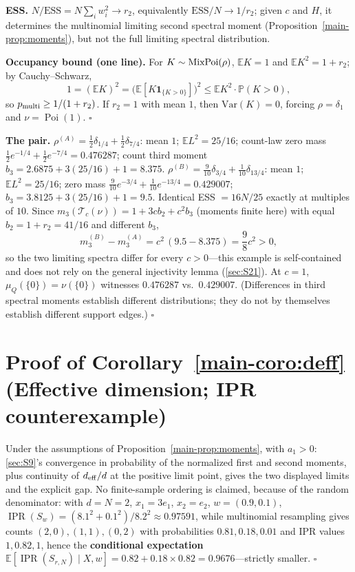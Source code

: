 \textbf{ESS.} $N/\mathrm{ESS}=N\sum_iw_i^2\to r_2$, equivalently $\mathrm{ESS}/N\to1/r_2$; given $c$ and $H$, it determines the multinomial limiting second spectral moment (Proposition~\ref{main-prop:moments}), but not the full limiting spectral distribution.

\textbf{Occupancy bound (one line).} For $K\sim\operatorname{MixPoi}(\rho)$, $\mathbb EK=1$ and $\mathbb EK^2=1+r_2$; by Cauchy--Schwarz,
\[
1=(\mathbb EK)^2=\big(\mathbb E[K\mathbf 1_{\{K>0\}}]\big)^2\le\mathbb EK^2\cdot\mathbb P(K>0),
\]
so $p_{\rm multi}\ge1/(1+r_2)$. If $r_2=1$ with mean $1$, then $\mathrm{Var}(K)=0$, forcing $\rho=\delta_1$ and $\nu=\operatorname{Poi}(1)$. $\square$

\textbf{The pair.} $\rho^{(A)}=\frac12\delta_{1/4}+\frac12\delta_{7/4}$: mean $1$; $\mathbb EL^2=25/16$; count-law zero mass $\frac12e^{-1/4}+\frac12e^{-7/4}=0.476287$; count third moment $b_3=2.6875+3(25/16)+1=8.375$. $\rho^{(B)}=\frac9{10}\delta_{3/4}+\frac1{10}\delta_{13/4}$: mean $1$; $\mathbb EL^2=25/16$; zero mass $\frac9{10}e^{-3/4}+\frac1{10}e^{-13/4}=0.429007$; $b_3=3.8125+3(25/16)+1=9.5$. Identical ESS $=16N/25$ exactly at multiples of $10$. Since $m_3(\mathcal T_c(\nu))=1+3cb_2+c^2b_3$ (moments finite here) with equal $b_2=1+r_2=41/16$ and different $b_3$,
\[
m_3^{(B)}-m_3^{(A)}=c^2\,(9.5-8.375)=\frac98c^2>0,
\]
so the two limiting spectra differ for every $c>0$—this example is self-contained and does not rely on the general injectivity lemma (\ref{sec:S21}). At $c=1$, $\mu_Q(\{0\})=\nu(\{0\})$ witnesses $0.476287$ vs.\ $0.429007$. (Differences in third spectral moments establish different distributions; they do not by themselves establish different support edges.) $\square$

\section{Proof of Corollary~\ref{main-coro:deff} (Effective dimension; IPR counterexample)}\label{sec:S11}

Under the assumptions of Proposition~\ref{main-prop:moments}, with $a_1>0$: \ref{sec:S9}'s convergence in probability of the normalized first and second moments, plus continuity of $d_{\mathrm{eff}}/d$ at the positive limit point, gives the two displayed limits and the explicit gap. No finite-sample ordering is claimed, because of the random denominator: with $d=N=2$, $x_1=3e_1$, $x_2=e_2$, $w=(0.9,0.1)$, $\operatorname{IPR}(S_w)=(8.1^2+0.1^2)/8.2^2\approx0.97591$, while multinomial resampling gives counts $(2,0),(1,1),(0,2)$ with probabilities $0.81,0.18,0.01$ and IPR values $1,0.82,1$, hence the \textbf{conditional expectation} $\mathbb E[\operatorname{IPR}(S_{r,N})\mid X,w]=0.82+0.18\times0.82=0.9676$—strictly smaller. $\square$

